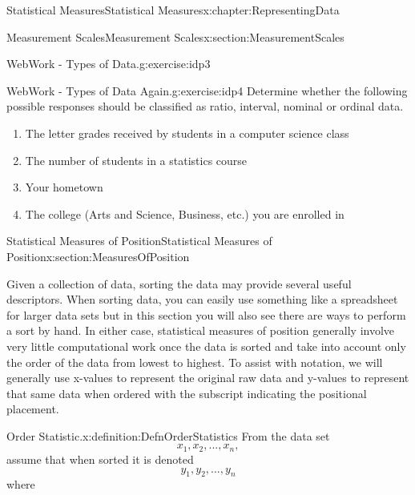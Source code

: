 \documentclass[oneside,10pt,]{book}
\numberwithin{equation}{section}
\begin{document}
\begin{chapterptx}{Statistical Measures}{}{Statistical Measures}{}{}{x:chapter:RepresentingData}
\begin{sectionptx}{Measurement Scales}{}{Measurement Scales}{}{}{x:section:MeasurementScales}
\begin{inlineexercise}{WebWork - Types of Data.}{g:exercise:idp3}
%
\end{inlineexercise}%
\begin{inlineexercise}{WebWork - Types of Data Again.}{g:exercise:idp4}%
Determine whether the following possible responses should be classified as ratio, interval, nominal or ordinal data.%
\par
%
\begin{enumerate}
\item{}The letter grades received by students in a computer science class%
\item{}The number of students in a statistics course%
\item{}Your hometown%
\item{}The college (Arts and Science, Business, etc.) you are enrolled in%
\end{enumerate}
%
\end{inlineexercise}%
\end{sectionptx}
%
%
\typeout{************************************************}
\typeout{************************************************}
%
\begin{sectionptx}{Statistical Measures of Position}{}{Statistical Measures of Position}{}{}{x:section:MeasuresOfPosition}
\begin{introduction}{}%
Given a collection of data, sorting the data may provide several useful descriptors. When sorting data, you can easily use something like a spreadsheet for larger data sets but in this section you will also see there are ways to perform a sort by hand. In either case, statistical measures of position generally involve very little computational work once the data is sorted and take into account only the order of the data from lowest to highest.  To assist with notation, we will generally use x-values to represent the original raw data and y-values to represent that same data when ordered with the subscript indicating the positional placement.%
\end{introduction}%
\begin{definition}{Order Statistic.}{x:definition:DefnOrderStatistics}%
\hypertarget{x:p:OrderStatistics}{}%
From the data set%
\begin{equation*}
x_1, x_2, ... , x_n,
\end{equation*}
assume that when sorted it is denoted%
\begin{equation*}
y_1, y_2, ..., y_n
\end{equation*}
where%
\begin{equation*}

\end{equation*}
\end{definition}
\end{sectionptx}
\end{chapterptx}
\end{document}
